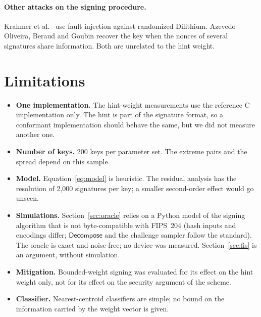 \documentclass{article}
\begin{document}
\paragraph{Other attacks on the signing procedure.}
Krahmer et al.\ \cite{krahmer2024correction} use fault injection against
randomized Dilithium.  Azevedo Oliveira, Beraud and Goubin
\cite{azevedo2025implicit} recover the key when the nonces of several
signatures share information.  Both are unrelated to the hint weight.

\section{Limitations}
\label{sec:limits}

\begin{itemize}[leftmargin=*]
  \item \textbf{One implementation.}  The hint-weight measurements use the
        reference C implementation only.  The hint is part of the signature
        format, so a conformant implementation should behave the same, but we
        did not measure another one.
  \item \textbf{Number of keys.}  200 keys per parameter set.  The extreme
        pairs and the spread depend on this sample.
  \item \textbf{Model.}  Equation~\eqref{eq:model} is heuristic.  The residual
        analysis has the resolution of 2,000 signatures per key; a smaller
        second-order effect would go unseen.
  \item \textbf{Simulations.}  Section~\ref{sec:oracle} relies on a Python
        model of the signing algorithm that is not byte-compatible with
        FIPS~204 (hash inputs and encodings differ; $\mathsf{Decompose}$ and the
        challenge sampler follow the standard).  The oracle is exact and
        noise-free; no device was measured.
        Section~\ref{sec:fis} is an argument, without simulation.
  \item \textbf{Mitigation.}  Bounded-weight signing was evaluated for its
        effect on the hint weight only, not for its effect on the security
        argument of the scheme.
  \item \textbf{Classifier.}  Nearest-centroid classifiers are simple; no
        bound on the information carried by the weight vector is given.
\end{itemize}

\end{document}
